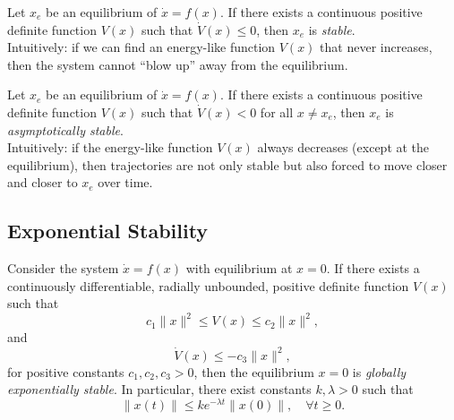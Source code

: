 \begin{corollary}
	Let $x_e$ be an equilibrium of $\dot{x}=f(x)$.  
	If there exists a continuous positive definite function $V(x)$ such that $\dot{V}(x) \leq 0$,  
	then $x_e$ is \emph{stable}.  
	\\[6pt]
	Intuitively: if we can find an energy-like function $V(x)$ that never increases, then the system cannot ``blow up'' away from the equilibrium.
\end{corollary}

\begin{corollary}
	Let $x_e$ be an equilibrium of $\dot{x}=f(x)$.  
	If there exists a continuous positive definite function $V(x)$ such that $\dot{V}(x) < 0$ for all $x\neq x_e$,  
	then $x_e$ is \emph{asymptotically stable}.  
	\\[6pt]
	Intuitively: if the energy-like function $V(x)$ always decreases (except at the equilibrium), then trajectories are not only stable but also forced to move closer and closer to $x_e$ over time.
\end{corollary}

\subsection{Exponential Stability}

\begin{theorem}
	Consider the system $\dot{x}=f(x)$ with equilibrium at $x=0$.  
	If there exists a continuously differentiable, radially unbounded, positive definite function $V(x)$ such that
	\begin{equation}
		c_1 \|x\|^2 \leq V(x) \leq c_2 \|x\|^2,
	\end{equation}
	and
	\begin{equation}
		\dot{V}(x) \leq -c_3 \|x\|^2,
	\end{equation}
	for positive constants $c_1, c_2, c_3 > 0$, then the equilibrium $x=0$ is \emph{globally exponentially stable}.  
	In particular, there exist constants $k,\lambda > 0$ such that
	\begin{equation}
		\|x(t)\| \leq k e^{-\lambda t}\|x(0)\|, \quad \forall t \geq 0.
	\end{equation}
\end{theorem}

